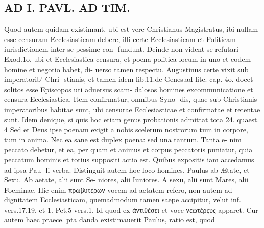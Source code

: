 \documentclass{article}
\begin{document}
\begin{pages}
\section*{AD I. PAVL. AD TIM. }
\marginpar{[ p.248 ]}Quod autem quidam existimant, ubi est vere Christianus Magistratus, ibi nullam esse censuram Ecclesiasticam debere, illi certe Ecclesiasticam et Politicam iurisdictionem inter se pessime con- fundunt. Deinde non vident se refutari Exod.1o. ubi et Ecclesiastica censura, et poena politica locum in uno et eodem homine et negotio habet, di- uerso tamen respectu. Augustinus certe vixit sub imperatorib' Chri- stianis, et tamen idem lib.11.de Genes.ad lite. cap. 4o. docet solitos esse Episcopos uti aduersus scam- dalosos homines excommunicatione et censura Ecclesiastica. Item confirmatur, omnibus Syno- dis, quae sub Christianis imperatoribus habitae sunt, ubi censurae Ecclesiasticae et confirmatae et retentae sunt. Idem denique, si quis hoc etiam genus probationis admittat tota 24. quaest. 4 Sed et Deus ipse poenam exigit a nobis scelerum nostrorum tum in corpore, tum in anima. Nec ea sane est duplex poena: sed una tantum. Tanta e- nim peccato debetur, et ea, per quam et animus et corpus peccatoris puniatur, quia peccatum hominis et totius suppositi actio est. Quibus expositis iam accedamus ad ipsa Pau- li verba. Distinguit autem hoc loco homines, Paulus ab Ætate, et Sexu. Ab aetate, alii sunt Se- niores, alii Iuniores. A sexu, alii sunt Mares, alii Foeminae. Hic enim πρωβυτέρων vocem ad aetatem refero, non autem ad dignitatem Ecclesiasticam, quemadmodum tamen saepe accipitur, velut inf. vers.17.19. et 1. Pet.5 vers.1. Id quod ex ἀντιθέσει et voce νεωτέρςυς apparet. Cur autem haec praece. pta danda existimauerit Paulus, ratio est, quod 

\end{pages}
\end{document}
